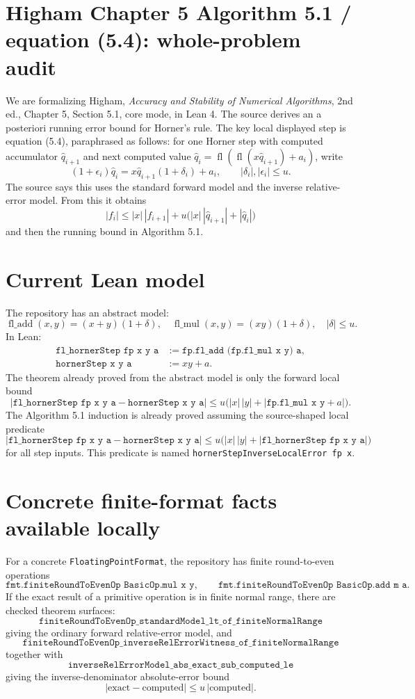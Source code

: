 \documentclass{article}
\begin{document}
\section*{Higham Chapter 5 Algorithm 5.1 / equation (5.4): whole-problem audit}

We are formalizing Higham, \emph{Accuracy and Stability of Numerical
Algorithms}, 2nd ed., Chapter 5, Section 5.1, core mode, in Lean 4.
The source derives an a posteriori running error bound for Horner's rule.
The key local displayed step is equation (5.4), paraphrased as follows:
for one Horner step with computed accumulator $\hat q_{i+1}$ and next
computed value $\hat q_i=\operatorname{fl}(\operatorname{fl}(x\hat
q_{i+1})+a_i)$, write
\[
  (1+\epsilon_i)\hat q_i = x\hat q_{i+1}(1+\delta_i)+a_i,
  \qquad |\delta_i|,|\epsilon_i|\le u.
\]
The source says this uses the standard forward model and the inverse
relative-error model. From this it obtains
\[
  |f_i| \le |x|\,|f_{i+1}|+
    u\bigl(|x|\,|\hat q_{i+1}|+|\hat q_i|\bigr)
\]
and then the running bound in Algorithm 5.1.

\section*{Current Lean model}

The repository has an abstract model:
\[
\operatorname{fl\_add}(x,y)=(x+y)(1+\delta),\quad
\operatorname{fl\_mul}(x,y)=(xy)(1+\delta),\quad |\delta|\le u.
\]
In Lean:
\[
\begin{aligned}
\texttt{fl\_hornerStep fp x y a}
  &:= \texttt{fp.fl\_add (fp.fl\_mul x y) a},\\
\texttt{hornerStep x y a} &:= xy+a.
\end{aligned}
\]
The theorem already proved from the abstract model is only the forward
local bound
\[
 |\texttt{fl\_hornerStep fp x y a}-\texttt{hornerStep x y a}|
 \le u\bigl(|x|\,|y|+|\texttt{fp.fl\_mul x y}+a|\bigr).
\]
The Algorithm 5.1 induction is already proved assuming the source-shaped
local predicate
\[
 |\texttt{fl\_hornerStep fp x y a}-\texttt{hornerStep x y a}|
 \le u\bigl(|x|\,|y|+|\texttt{fl\_hornerStep fp x y a}|\bigr)
\]
for all step inputs. This predicate is named
\texttt{hornerStepInverseLocalError fp x}.

\section*{Concrete finite-format facts available locally}

For a concrete \texttt{FloatingPointFormat}, the repository has finite
round-to-even operations
\[
\texttt{fmt.finiteRoundToEvenOp BasicOp.mul x y},\qquad
\texttt{fmt.finiteRoundToEvenOp BasicOp.add m a}.
\]
If the exact result of a primitive operation is in finite normal range,
there are checked theorem surfaces:
\[
\texttt{finiteRoundToEvenOp\_standardModel\_lt\_of\_finiteNormalRange}
\]
giving the ordinary forward relative-error model, and
\[
\texttt{finiteRoundToEvenOp\_inverseRelErrorWitness\_of\_finiteNormalRange}
\]
together with
\[
\texttt{inverseRelErrorModel\_abs\_exact\_sub\_computed\_le}
\]
giving the inverse-denominator absolute-error bound
\[
 |\text{exact}-\text{computed}| \le u\,|\text{computed}|.
\]
\end{document}
